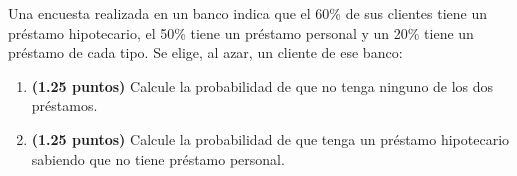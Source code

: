 
Una encuesta realizada en un banco indica que el 60\% de sus clientes tiene un préstamo hipotecario, el 50\% tiene un préstamo personal y un 20\% tiene un préstamo de cada tipo. Se elige, al azar, un cliente de ese banco:
\begin{enumerate}[label=\alph*)]
\item \textbf{(1.25 puntos)} Calcule la probabilidad de que no tenga ninguno de los dos préstamos.
\item \textbf{(1.25 puntos)} Calcule la probabilidad de que tenga un préstamo hipotecario sabiendo que no tiene préstamo personal.
\end{enumerate}
